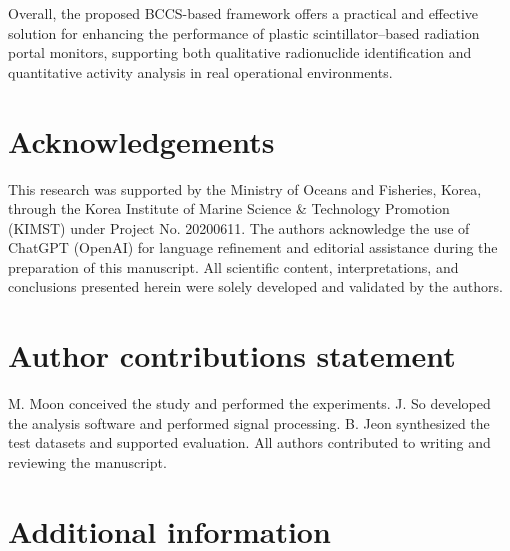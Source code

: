 \documentclass[10pt]{wlscirep}
\begin{document}
Overall, the proposed BCCS-based framework offers a practical and effective solution for enhancing the performance of plastic scintillator–based radiation portal monitors, supporting both qualitative radionuclide identification and quantitative activity analysis in real operational environments.

\section*{Acknowledgements}

This research was supported by the Ministry of Oceans and Fisheries, Korea, through the Korea Institute of Marine Science \& Technology Promotion (KIMST) under Project No. 20200611. The authors acknowledge the use of ChatGPT (OpenAI) for language refinement and editorial assistance during the preparation of this manuscript. All scientific content, interpretations, and conclusions presented herein were solely developed and validated by the authors.

\section*{Author contributions statement}
M. Moon conceived the study and performed the experiments. J. So developed the analysis software and performed signal processing. B. Jeon synthesized the test datasets and supported evaluation. All authors contributed to writing and reviewing the manuscript.



\section*{Additional information}


\end{document}
